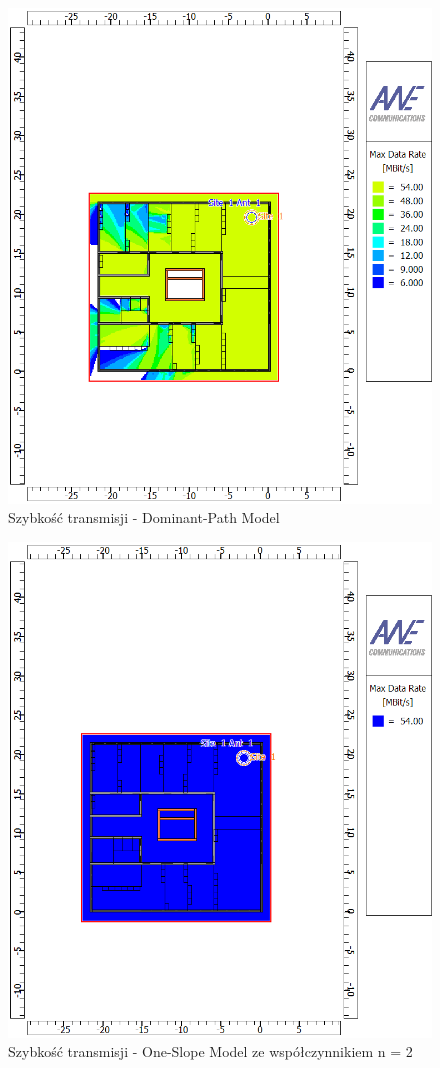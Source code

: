 \documentclass[12pt, a4paper, oneside]{article}
\begin{document}
\begin{figure}[h]
\centering
\caption{Szybkość transmisji - Dominant-Path Model}
\includegraphics[scale=0.65]{DPM_RATE.png}
\end{figure}
\begin{figure}[h]
\centering
\caption{Szybkość transmisji - One-Slope Model ze współczynnikiem n = 2}
\includegraphics[scale=0.65]{ONE_SLOPE_RATE_EXP_2.png}
\end{figure}
\end{document}
